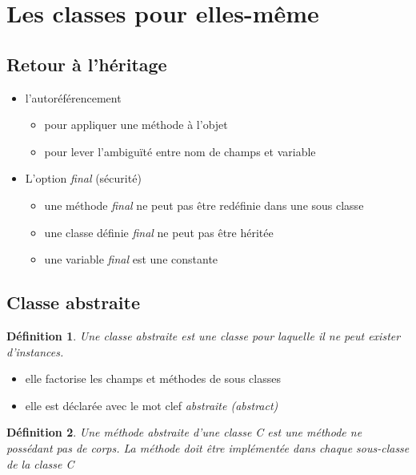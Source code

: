 \documentclass{article}
\newtheorem{definition}{Définition}
\begin{document}
\section{Les classes pour elles-même}

\subsection{Retour à l'héritage}

\begin{itemize}
	\item l'autoréférencement
	\begin{itemize}
		\item pour appliquer une méthode à l'objet
		\item pour lever l'ambiguïté entre nom de champs et variable
	\end{itemize}
	\item L'option \emph{final} (sécurité)
	\begin{itemize}
		\item une méthode \emph{final} ne peut pas être redéfinie dans une sous classe
		\item une classe définie \emph{final} ne peut pas être héritée
		\item une variable \emph{final} est une constante
	\end{itemize}
\end{itemize}

\subsection{Classe abstraite}

\begin{definition}
	Une classe abstraite est une classe pour laquelle il ne peut
exister d'instances.
\end{definition}

\begin{itemize}
	\item elle factorise les champs et méthodes de sous classes
	\item elle est déclarée avec le mot clef \emph{abstraite (abstract)}
\end{itemize}

\begin{definition}
	Une méthode abstraite d'une classe C est une méthode ne
possédant pas de corps. La méthode doit être implémentée dans chaque
sous-classe de la classe C
\end{definition}
\end{document}
